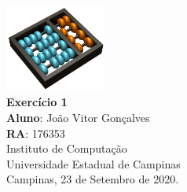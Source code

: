 \documentclass[12pt,a4paper]{report}
\begin{document}
\begin{titlepage}
    \begin{center}
        \vspace*{1cm}
        \includegraphics[width=0.25\textwidth]{Logo}\\
        \vspace{1.5cm}
        \Huge
        \textbf{Exercício 1}\\
        \vspace{1.5cm}
        \Large
        \textbf{Aluno}: João Vitor Gonçalves\\
        \textbf{RA}: 176353\\
        \vspace{1.2cm}
        \Large
        Instituto de Computação\\
        Universidade Estadual de Campinas\\
        \vspace{1.5cm}
        Campinas, 23 de Setembro de 2020.
    \end{center}
\end{titlepage}
\tableofcontents
\clearpage

\newcommand{\shellcmd}[1]{\texttt{\footnotesize\# #1}}%



\end{document}
